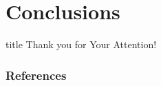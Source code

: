 \documentclass[aspectratio=169]{beamer}
\begin{document}
\section{Conclusions}

\begin{frame}
  \vfill
  \centering
  \begin{beamercolorbox}[sep=8pt,center,shadow=true,rounded=true]{title}
    Thank you for Your Attention!%
    \par%
  \end{beamercolorbox}
  \vfill
\end{frame}

\begin{frame}
  \frametitle{References}
  \AtNextBibliography{\tiny}
  \begin{multicols}{2}
    \nocite{*}
    \printbibliography
  \end{multicols}
\end{frame}
\end{document}

